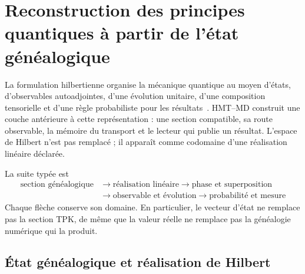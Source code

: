 
\section{Reconstruction des principes quantiques à partir de l’état généalogique}
\label{sec:postulados-cuanticos-genealogicos-rev2}

La formulation hilbertienne organise la mécanique quantique au moyen d’états,
d’observables autoadjointes, d’une évolution unitaire, d’une composition tensorielle et d’une
règle probabiliste pour les résultats~\cite{vonNeumann1932}. HMT--MD
construit une couche antérieure à cette représentation : une section compatible,
sa route observable, la mémoire du transport et le lecteur qui publie un
résultat. L’espace de Hilbert n’est pas remplacé ; il apparaît comme codomaine d’une
réalisation linéaire déclarée.

La suite typée est
\[
 \boxed{\begin{aligned}
 \text{section généalogique}
 &\longrightarrow \text{réalisation linéaire}
 \longrightarrow \text{phase et superposition}\\
 &\longrightarrow \text{observable et évolution}
 \longrightarrow \text{probabilité et mesure}
 \end{aligned}}
\]
Chaque flèche conserve son domaine. En particulier, le vecteur d’état ne
remplace pas la section TPK, de même que la valeur réelle ne remplace pas
la généalogie numérique qui la produit.

\subsection{État généalogique et réalisation de Hilbert}

